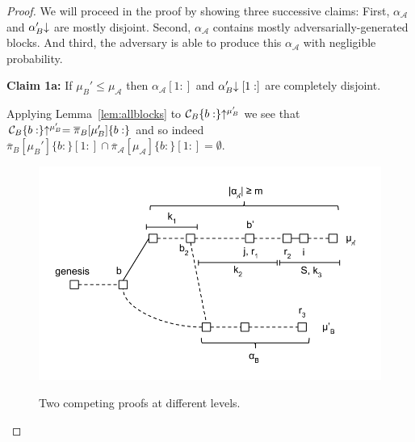 \begin{proof}
%

%

    We will proceed in the proof by showing three successive claims: First,
    $\alpha_\mathcal{A}$ and $\alpha'_B\negthickspace\downarrow$ are mostly
    disjoint. Second, $\alpha_\mathcal{A}$ contains mostly
    adversarially-generated blocks. And third, the adversary is able to produce
    this $\alpha_\mathcal{A}$ with negligible probability.

    \textbf{Claim 1a: } If $\mu_B' \leq \mu_\mathcal{A}$ then
    $\alpha_\mathcal{A}[1:]$ and $\alpha'_B\negthickspace\downarrow[1:]$ are completely
    disjoint.

    Applying Lemma~\ref{lem:allblocks}
    to $\mathcal{C}_B\{b:\}\negthickspace\uparrow^{\mu_B'}$ we see that
    $\mathcal{C}_B\{b:\}\negthickspace\uparrow^{\mu_B'} = \overline\pi_B[\mu_B']\{b:\}$ and so
    indeed
    $\overline\pi_B[\mu_B']\{b:\}[1:] \cap
    \overline\pi_\mathcal{A}[\mu_\mathcal{A}]\{b:\}[1:] = \emptyset$.

    \begin{figure}
        \caption{Two competing proofs at different levels.}
        \centering
        \includegraphics[width=\columnwidth,keepaspectratio]{figures/security-proof-chain.png}
        \label{fig.sec-comparison}
    \end{figure}


\end{proof}
